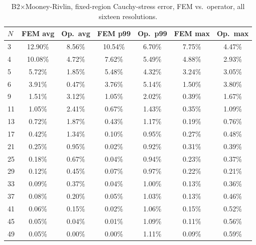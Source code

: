 \documentclass[final,5p,times]{elsarticle}
\begin{document}
\begin{table}[ht]
\centering
\caption{B2$\times$Mooney-Rivlin, fixed-region Cauchy-stress error, FEM
  vs.\ operator, all sixteen resolutions.}
\label{tab:b1-b2mr-b}
\scriptsize
\begin{tabular}{lcccccc}
\toprule
$N$ & FEM avg & Op.\ avg & FEM p99 & Op.\ p99 & FEM max & Op.\ max \\
\midrule
3  & 12.90\% & 8.56\% & 10.54\% & 6.70\% & 7.75\% & 4.47\% \\
4  & 10.08\% & 4.72\% & 7.62\%  & 5.49\% & 4.88\% & 2.93\% \\
5  & 5.72\%  & 1.85\% & 5.48\%  & 4.32\% & 3.24\% & 3.05\% \\
6  & 3.91\%  & 0.47\% & 3.76\%  & 5.14\% & 1.50\% & 3.80\% \\
9  & 1.51\%  & 3.12\% & 1.05\%  & 2.02\% & 0.39\% & 1.67\% \\
11 & 1.05\%  & 2.41\% & 0.67\%  & 1.43\% & 0.35\% & 1.09\% \\
13 & 0.72\%  & 1.87\% & 0.43\%  & 1.17\% & 0.19\% & 0.76\% \\
17 & 0.42\%  & 1.34\% & 0.10\%  & 0.95\% & 0.27\% & 0.48\% \\
21 & 0.25\%  & 0.95\% & 0.02\%  & 0.92\% & 0.31\% & 0.39\% \\
25 & 0.18\%  & 0.67\% & 0.04\%  & 0.94\% & 0.23\% & 0.37\% \\
29 & 0.12\%  & 0.45\% & 0.07\%  & 0.97\% & 0.22\% & 0.21\% \\
33 & 0.09\%  & 0.37\% & 0.04\%  & 1.00\% & 0.13\% & 0.36\% \\
37 & 0.08\%  & 0.20\% & 0.05\%  & 1.03\% & 0.13\% & 0.46\% \\
41 & 0.06\%  & 0.15\% & 0.02\%  & 1.06\% & 0.15\% & 0.52\% \\
45 & 0.05\%  & 0.04\% & 0.01\%  & 1.09\% & 0.11\% & 0.56\% \\
49 & 0.05\%  & 0.00\% & 0.00\%  & 1.11\% & 0.09\% & 0.59\% \\
\bottomrule
\end{tabular}
\end{table}
\end{document}
